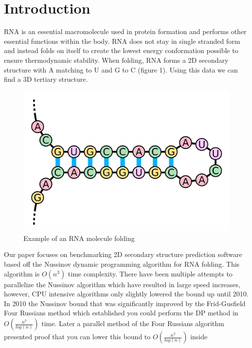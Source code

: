 \documentclass[12pt]{article}
\begin{document}
\section{Introduction}
\par RNA is an essential macromolecule used in protein formation and performs other essential functions within the body\cite{turner}. RNA does not stay in single stranded form and instead folds on itself to create the lowest energy conformation possible to ensure thermodynamic stability\cite{herschlag}. When folding, RNA forms a 2D secondary structure\cite{mccaskill} with A matching to U and G to C (figure 1).  Using this data we can find a 3D tertiary structure\cite{mccaskill}.
\begin{figure}[ht!]
  \centering
  \includegraphics[keepaspectratio, scale=0.12]{fold-example.png}
  \caption{Example of an RNA molecule folding}
  \label{fig:RNA Folding}
\end{figure}
\par Our paper focuses on benchmarking 2D secondary structure prediction software
based off the Nussinov dynamic programming algorithm\cite{nussinov} for RNA folding.
This algorithm is $O(n^3)$ time complexity. There have been multiple attempts to
parallelize the Nussinov algorithm\cite{rizk, other-gpu} which have resulted in
large speed increases, however, CPU intensive algorithms only slightly lowered
the bound up until 2010\cite{minor-nussinov-improvement, chan}. In 2010 the
Nussinov bound that was significantly improved by the Frid-Gusfield Four Russians
method which established you could perform the DP method in $O(\frac{n^3}{log(n)})$
time\cite{gusfield}. Later a parallel method of the Four Russians algorithm
presented proof that you can lower this bound to $O(\frac{n^2}{log(n)})$ inside
\end{document}
